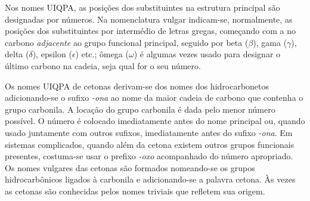 Nos nomes UIQPA, as posições dos substituintes na estrutura principal são designadas por números. Na nomenclatura vulgar indicam-se, normalmente, as posições dos substituintes por intermédio de letras gregas, começando com a no carbono \textit{adjacente} ao grupo funcional principal, seguido por beta ($\beta$), gama ($\gamma$), delta ($\delta$), epsilon ($\epsilon$) etc.; ômega ($\omega$) é algumas vezes usado para designar o último carbono na cadeia, seja qual for o seu número.

\begin{tightcenter}
    \chemnameinit{}
    \qquad
\end{tightcenter}

Os nomes UIQPA de cetonas derivam-se dos nomes dos hidrocarbonetos adicionando-se o sufixo \textit{-ona} ao nome da maior cadeia de carbono que contenha o grupo carbonila. A locação do grupo carbonila é dada pelo menor número possível. O número é colocado imediatamente antes do nome principal ou, quando usado juntamente com outros sufixos, imediatamente antes do sufixo \textit{-ona}. Em sistemas complicados, quando além da cetona existem outros grupos funcionais presentes, costuma-se usar o prefixo \textit{-oxo} acompanhado do número apropriado. Os nomes vulgares das cetonas são formados nomeando-se os grupos hidrocarbônicos ligados à carbonila e adicionando-se a palavra cetona. Às vezes as cetonas são conhecidas pelos nomes triviais que refletem sua origem. 

\begin{tightcenter}
    \chemnameinit{}
    \qquad
    \qquad
    \qquad
    \chemnameinit{}
    \qquad
    \qquad
\end{tightcenter}

